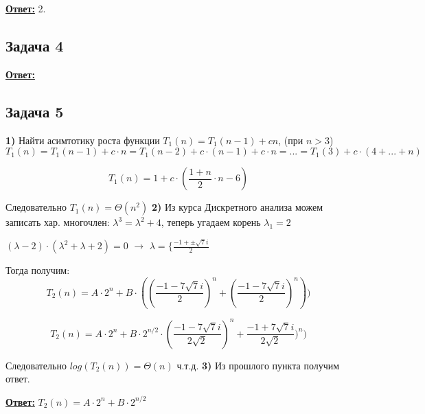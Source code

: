 \documentclass[a4paper,14pt]{article} %
\begin{document}
\underline{\textbf{Ответ:}} 2.

\subsection{Задача 4}


\underline{\textbf{Ответ:}}

\subsection{Задача 5}
\textbf{1)} Найти асимтотику роста функции $T_1(n) = T_1(n-1) + cn$, (при $n > 3$)
\begin{equation*}
	T_1(n) = T_1(n-1) + c \cdot n = T_1(n-2) + c \cdot (n - 1) + c \cdot n = ... = T_1(3) + c \cdot (4 + ... + n)
\end{equation*}

\begin{equation*}
	T_1(n) = 1 + c \cdot (\frac{1+n}{2} \cdot n - 6)
\end{equation*}

Следовательно $T_1(n) = \Theta(n^2)$
\newline
\textbf{2)}
Из курса Дискретного анализа можем записать хар. многочлен: $\lambda^3 = \lambda^2 + 4$, теперь угадаем корень $\lambda_1 = 2$

$(\lambda -2) \cdot (\lambda^2 + \lambda +2) = 0$ $\rightarrow$ $\lambda = \{ \frac{-1 + \pm \sqrt{7}i}{2}$

Тогда получим: 
\begin{equation*}
	T_2(n) = A \cdot 2^n + B \cdot ( (\frac{-1-7\sqrt{7}i}{2})^n + (\frac{-1-7\sqrt{7}i}{2})^n))
\end{equation*}

\begin{equation*}
	T_2(n) = A \cdot 2^n + B \cdot 2^{n/2} \cdot (\frac{-1-7\sqrt{7}i}{2 \sqrt{2}})^n + \frac{-1+7\sqrt{7}i}{2 \sqrt{2}})^n) 	
\end{equation*}


Следовательно $log(T_2(n)) = \Theta(n)$ ч.т.д.
\newline
\textbf{3)} Из прошлого пункта получим ответ.

\underline{\textbf{Ответ:}}
$T_2(n) = A \cdot 2^n + B \cdot 2^{n/2}$
\end{document}
